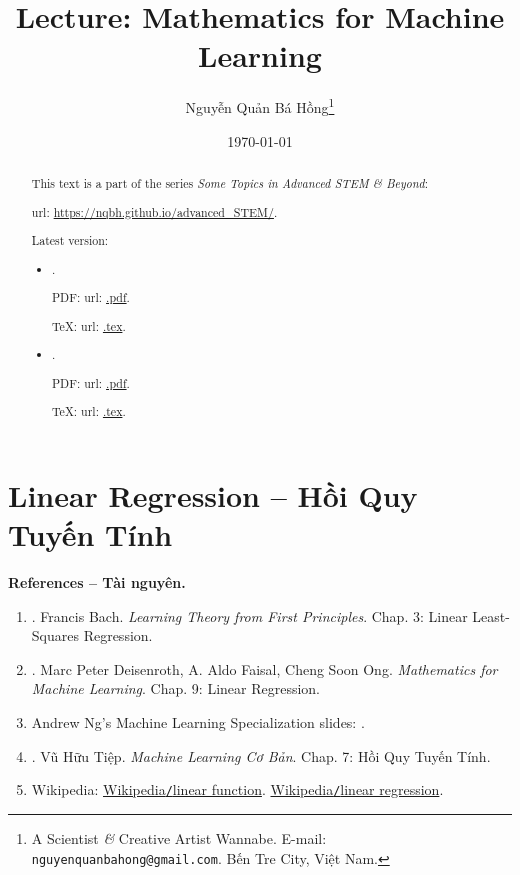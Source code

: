 \documentclass{article}
\title{Lecture: Mathematics for Machine Learning}
\author{Nguyễn Quản Bá Hồng\footnote{A Scientist {\it\&} Creative Artist Wannabe. E-mail: {\tt nguyenquanbahong@gmail.com}. Bến Tre City, Việt Nam.}}
\date{\today}
\begin{document}
\maketitle
\begin{abstract}
	This text is a part of the series {\it Some Topics in Advanced STEM \& Beyond}:
	
	{\sc url}: \url{https://nqbh.github.io/advanced_STEM/}.
	
	Latest version:
	\begin{itemize}
		\item {\it }.
		
		PDF: {\sc url}: \url{.pdf}.
		
		\TeX: {\sc url}: \url{.tex}.
		\item {\it }.
		
		PDF: {\sc url}: \url{.pdf}.
		
		\TeX: {\sc url}: \url{.tex}.
	\end{itemize}
\end{abstract}
\tableofcontents


\section{Linear Regression -- Hồi Quy Tuyến Tính}
\textbf{\textsf{References -- Tài nguyên.}}
\begin{enumerate}
	\item \cite{Bach2024}. {\sc Francis Bach}. {\it Learning Theory from First Principles}. Chap. 3: Linear Least-Squares Regression.
	\item \cite{Deisenroth_Faisal_Ong2023}. {\sc Marc Peter Deisenroth, A. Aldo Faisal, Cheng Soon Ong}. {\it Mathematics for Machine Learning}. Chap. 9: Linear Regression.
	\item {\sc Andrew Ng}'s Machine Learning Specialization slides: \url{}.
	\item \cite{Tiep_ML_co_ban}. {\sc Vũ Hữu Tiệp}. {\it Machine Learning Cơ Bản}. Chap. 7: Hồi Quy Tuyến Tính.
	\item Wikipedia: \href{https://en.wikipedia.org/wiki/Linear_function}{Wikipedia{\tt/}linear function}. \href{https://en.wikipedia.org/wiki/Linear_regression}{Wikipedia{\tt/}linear regression}.
\end{enumerate}
\end{document}
